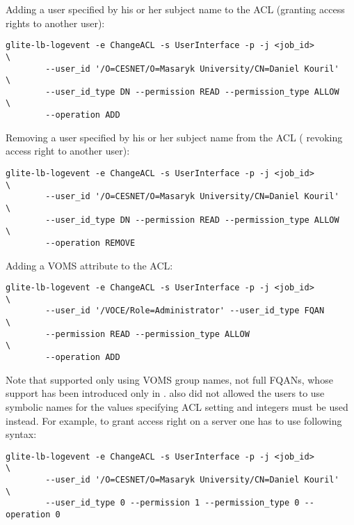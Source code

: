 Adding a user specified by his or her subject name to the ACL (\ie granting
access rights to another user):

\begin{verbatim}
glite-lb-logevent -e ChangeACL -s UserInterface -p -j <job_id>          \
        --user_id '/O=CESNET/O=Masaryk University/CN=Daniel Kouril'     \
        --user_id_type DN --permission READ --permission_type ALLOW     \
        --operation ADD
\end{verbatim}


Removing a user specified by his or her subject name from the ACL (\ie
revoking access right to another user):

\begin{verbatim}
glite-lb-logevent -e ChangeACL -s UserInterface -p -j <job_id>          \
        --user_id '/O=CESNET/O=Masaryk University/CN=Daniel Kouril'     \
        --user_id_type DN --permission READ --permission_type ALLOW     \
        --operation REMOVE
\end{verbatim}


Adding a VOMS attribute to the ACL:

\begin{verbatim}
glite-lb-logevent -e ChangeACL -s UserInterface -p -j <job_id>          \
        --user_id '/VOCE/Role=Administrator' --user_id_type FQAN        \
        --permission READ --permission_type ALLOW                       \
        --operation ADD
\end{verbatim}


Note that \LBold supported only using VOMS group names, not full FQANs,
whose support has been introduced only in \LBnew. \LBold also did not
allowed the users to use symbolic names for the values specifying ACL
setting and integers must be used instead. For example, to grant access
right on a \LBold server one has to use following syntax:

\begin{verbatim}
glite-lb-logevent -e ChangeACL -s UserInterface -p -j <job_id>          \
        --user_id '/O=CESNET/O=Masaryk University/CN=Daniel Kouril'     \
        --user_id_type 0 --permission 1 --permission_type 0 --operation 0
\end{verbatim}
